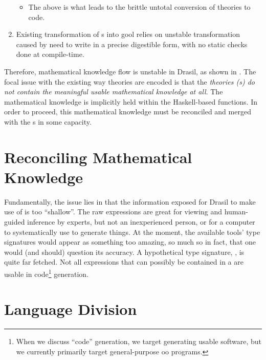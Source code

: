 \begin{enumerate}
\begin{itemize}
		      \item The above is what leads to the brittle untotal conversion of
		            theories to code.

	      \end{itemize}

	\item Existing transformation of \RelationConcept{}s into \acs{gool} relies
	      on unstable transformation caused by need to write in a precise
	      digestible form, with no static checks done at compile-time.

\end{enumerate}

Therefore, mathematical knowledge flow is unstable in Drasil, as shown in
. The focal issue with the existing way theories
are encoded is that the \textit{theories (\RelationConcept{}s) do not contain
	the meaningful usable mathematical knowledge at all}. The mathematical knowledge
is implicitly held within the Haskell-based functions. In order to proceed, this mathematical knowledge
must be reconciled and merged with the \RelationConcept{}s in some capacity.

\theoriesWithoutModelKinds{}

\section{Reconciling Mathematical Knowledge}

Fundamentally, the issue lies in that the information exposed for Drasil to make
use of is too ``shallow''. The raw expressions are great for viewing and
human-guided inference by experts, but not an inexperienced person, or for a
computer to systematically use to generate things. At the moment, the available
tools' type signatures would appear as something too amazing, so much so in
fact, that one would (and should) question its accuracy. A hypothetical type
signature, , is quite far fetched. Not all
expressions that can possibly be contained in a \RelationConcept{} are usable in
code\footnote{When we discuss ``code'' generation, we target generating usable
	software, but we currently primarily target general-purpose \acs{oo} programs.}
generation.

\section{Language Division}

